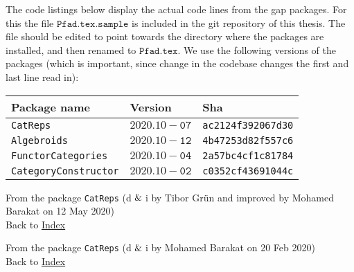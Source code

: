 
The code listings below display the actual code lines from the gap packages. For this the file $\mathtt{Pfad.tex.sample}$ is included in the
git repository of this thesis. The file should be edited to point towards
the \Gap{} directory where the packages are installed, and then renamed to $\mathtt{Pfad.tex}$.
We use the following versions of the \Gap{} packages (which is important, since change in the codebase changes the first and last line read in):\\

\begin{tabular}[h]{l|l|l}
Package name & Version & Sha \\
\hline
\texttt{CatReps} & $\mathtt{2020.10-07}$ & \texttt{ac2124f392067d30} \\
\texttt{Algebroids} & $\mathtt{2020.10-12}$ & \texttt{4b47253d82f557c6} \\
\texttt{FunctorCategories} & $\mathtt{2020.10-04}$ & \texttt{2a57bc4cf1c81784} \\
\texttt{CategoryConstructor} & $\mathtt{2020.10-02}$ & \texttt{c0352cf43691044c}
\end{tabular} 

\lstlistoflistings\label{lol}

\renewcommand{\lstlistingname}{Procedure}



From the package \texttt{CatReps} (d$\And$i by Tibor Grün and improved by Mohamed Barakat on 12 May 2020) \\
Back to \hyperref[lol]{Index}


From the package \texttt{CatReps} (d$\And$i by Mohamed Barakat on 20 Feb 2020) \\
Back to \hyperref[lol]{Index}
		

